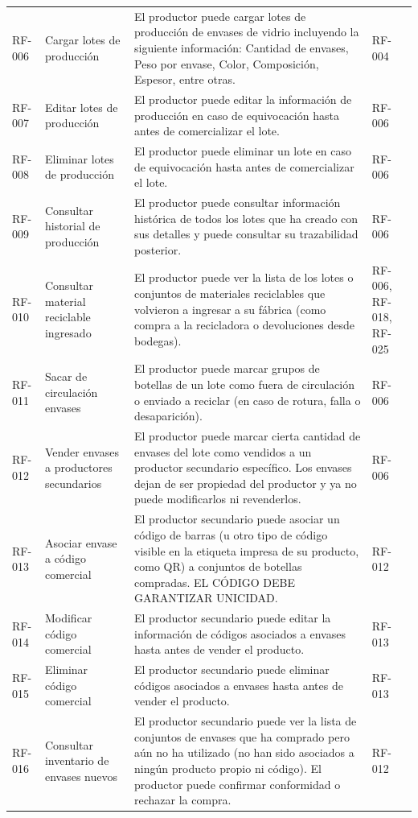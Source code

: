 \begin{xltabular}{\textwidth}{@{} L{1.5cm} L{2.5cm} Y L{1.5cm} @{}}
	RF-006 & Cargar lotes de producción & El productor puede cargar lotes de producción de envases de vidrio incluyendo la siguiente información: Cantidad de envases, Peso por envase, Color, Composición, Espesor, entre otras. & RF-004 \\
	RF-007 & Editar lotes de producción & El productor puede editar la información de producción en caso de equivocación hasta antes de comercializar el lote. & RF-006 \\
	RF-008 &Eliminar lotes de producción &El productor puede eliminar un lote en caso de equivocación hasta antes de comercializar el lote. & RF-006 \\
	RF-009 & Consultar historial de producción & El productor puede consultar información histórica de todos los lotes que ha creado con sus detalles y puede consultar su trazabilidad posterior. & RF-006 \\
	RF-010 & Consultar material reciclable ingresado & El productor puede ver la lista de los lotes o conjuntos de materiales reciclables que volvieron a ingresar a su fábrica (como compra a la recicladora o devoluciones desde bodegas). & RF-006, RF-018, RF-025 \\
	RF-011 & Sacar de circulación envases & El productor puede marcar grupos de botellas de un lote como fuera de circulación o enviado a reciclar (en caso de rotura, falla o desaparición). & RF-006 \\
	RF-012 & Vender envases a productores secundarios & El productor puede marcar cierta cantidad de envases del lote como vendidos a un productor secundario específico. Los envases dejan de ser propiedad del productor y ya no puede modificarlos ni revenderlos. & RF-006 \\
	RF-013 & Asociar envase a código comercial & El productor secundario puede asociar un código de barras (u otro tipo de código visible en la etiqueta impresa de su producto, como QR) a conjuntos de botellas compradas. EL CÓDIGO DEBE GARANTIZAR UNICIDAD. & RF-012 \\
	RF-014 & Modificar código comercial & El productor secundario puede editar la información de códigos asociados a envases hasta antes de vender el producto. & RF-013 \\
	RF-015 & Eliminar código comercial & El productor secundario puede eliminar códigos asociados a envases hasta antes de vender el producto. & RF-013 \\
	RF-016 & Consultar inventario de envases nuevos & El productor secundario puede ver la lista de conjuntos de envases que ha comprado pero aún no ha utilizado (no han sido asociados a ningún producto propio ni código). El productor puede confirmar conformidad o rechazar la compra. & RF-012 \\

\end{xltabular}
